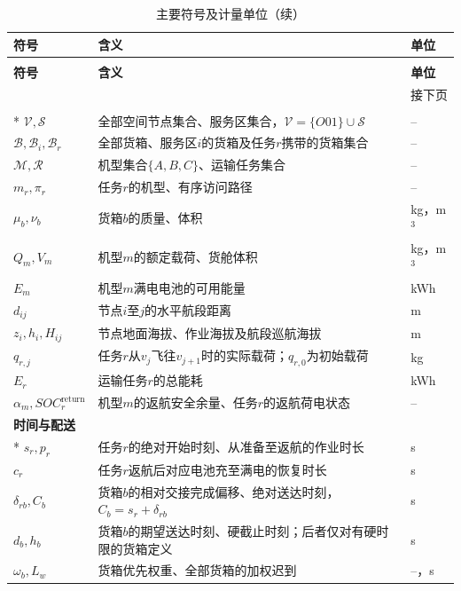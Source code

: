\begingroup
\begin{longtable}{@{}p{3.0cm}p{\dimexpr\textwidth-4.8cm-4\tabcolsep\relax}p{1.8cm}@{}}
\caption{主要符号及计量单位}\label{tab:main_symbols}\\
\toprule
\textbf{符号} & \textbf{含义} & \textbf{单位}\\
\midrule
\endfirsthead
\caption[]{主要符号及计量单位（续）}\\
\toprule
\textbf{符号} & \textbf{含义} & \textbf{单位}\\
\midrule
\endhead
\midrule
\multicolumn{3}{r}{\small 接下页}\\
\endfoot
\bottomrule
\endlastfoot
\multicolumn{3}{l}{\textbf{对象与物理量}}\\*
$\mathcal V,\mathcal S$ & 全部空间节点集合、服务区集合，$\mathcal V=\{O01\}\cup\mathcal S$ & --\\
$\mathcal B,\mathcal B_i,\mathcal B_r$ & 全部货箱、服务区$i$的货箱及任务$r$携带的货箱集合 & --\\
$\mathcal M,\mathcal R$ & 机型集合$\{A,B,C\}$、运输任务集合 & --\\
$m_r,\pi_r$ & 任务$r$的机型、有序访问路径 & --\\
$\mu_b,\nu_b$ & 货箱$b$的质量、体积 & kg，m$^3$\\
$Q_m,V_m$ & 机型$m$的额定载荷、货舱体积 & kg，m$^3$\\
$E_m$ & 机型$m$满电电池的可用能量 & kWh\\
$d_{ij}$ & 节点$i$至$j$的水平航段距离 & m\\
$z_i,h_i,H_{ij}$ & 节点地面海拔、作业海拔及航段巡航海拔 & m\\
$q_{r,j}$ & 任务$r$从$v_j$飞往$v_{j+1}$时的实际载荷；$q_{r,0}$为初始载荷 & kg\\
$E_r$ & 运输任务$r$的总能耗 & kWh\\
$\alpha_m,SOC_r^{\mathrm{return}}$ & 机型$m$的返航安全余量、任务$r$的返航荷电状态 & --\\
\midrule
\multicolumn{3}{l}{\textbf{时间与配送}}\\*
$s_r,p_r$ & 任务$r$的绝对开始时刻、从准备至返航的作业时长 & s\\
$c_r$ & 任务$r$返航后对应电池充至满电的恢复时长 & s\\
$\delta_{rb},C_b$ & 货箱$b$的相对交接完成偏移、绝对送达时刻，$C_b=s_r+\delta_{rb}$ & s\\
$d_b,h_b$ & 货箱$b$的期望送达时刻、硬截止时刻；后者仅对有硬时限的货箱定义 & s\\
$\omega_b,L_w$ & 货箱优先权重、全部货箱的加权迟到 & --，s\\

\end{longtable}
